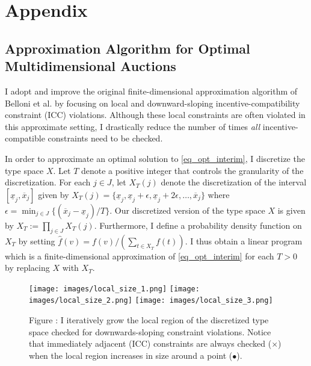 \chapter{Appendix}\label{ch_appendix}

\section{Approximation Algorithm for Optimal Multidimensional Auctions}\label{appendix:algo}

I adopt and improve the original finite-dimensional approximation algorithm of Belloni et al. \autocite*{belloni2010multidimensional} by focusing on local and downward-sloping incentive-compatibility constraint (ICC) violations. Although these local constraints are often violated in this approximate setting, I drastically reduce the number of times \textit{all} incentive-compatible constraints need to be checked.

In order to approximate an optimal solution to \ref{eq_opt_interim}, I discretize the type space $X$. Let $T$ denote a positive integer that controls the granularity of the discretization. For each $j \in J$, let $X_T(j)$ denote the discretization of the interval $[\underline{x}_j,\overline{x}_j]$ given by $X_T(j) = \{\underline{x}_j, \underline{x}_j + \epsilon, \underline{x}_j + 2\epsilon, \dots, \overline{x}_j\}$ where $\epsilon = \min_{j \in J} \{(\overline{x}_j - \underline{x}_j) / T\}$. Our discretized version of the type space $X$ is given by $X_T := \prod_{j \in J} X_T(j)$. Furthermore, I define a probability density function on $X_T$ by setting $\hat{f}(v) = f(v) / (\sum_{t \in X_T} f(t))$. I thus obtain a linear program which is a finite-dimensional approximation of \ref{eq_opt_interim} for each $T > 0$ by replacing $X$ with $X_T$.

\begin{figure}[t]
    \begin{center}
    \texttt{[image: images/local\_size\_1.png]}
    \texttt{[image: images/local\_size\_2.png]}
    \texttt{[image: images/local\_size\_3.png]}
    \end{center}
    
    \vspace{1mm}
    \raggedright{\small {\sc Figure \thefig\label{fig:sim1}:} I iteratively grow the local region of the discretized type space checked for downwards-sloping constraint violations. Notice that immediately adjacent (ICC) constraints are always checked ($\times$) when the local region increases in size around a point ($\bullet$).}
\end{figure}


